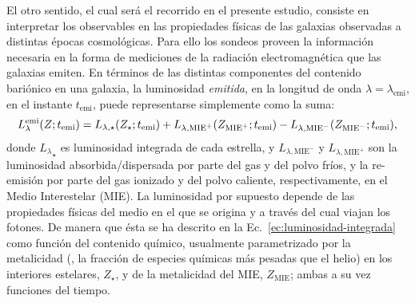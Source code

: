 El otro sentido, el cual será el recorrido en el presente estudio, consiste en interpretar los
observables en las propiedades físicas de las galaxias observadas a distintas épocas cosmológicas.
Para ello los sondeos proveen la información necesaria en la forma de mediciones de la radiación
electromagnética que las galaxias emiten. En términos de las distintas componentes del contenido
bariónico en una galaxia, la luminosidad \emph{emitida}, en la longitud de onda
$\lambda=\lambda_\text{emi}$, en el instante $t_\text{emi}$, puede representarse simplemente como la
suma:
%
\begin{equation}\label{ec:luminosidad-integrada}
{L}_\lambda^\text{emi}(Z;t_\text{emi}) = L_{\lambda,\star}(Z_\star;t_\text{emi}) +
                             L_{\lambda,\text{MIE}^+}(Z_{\text{MIE}^+};t_\text{emi}) -
                             L_{\lambda,\text{MIE}^-}(Z_{\text{MIE}^-};t_\text{emi}),
\end{equation}
%
donde ${L_\lambda}_\star$ es luminosidad integrada de cada estrella, y $L_{\lambda,\text{MIE}^-}$ y
$L_{\lambda,\text{MIE}^+}$ son la luminosidad absorbida/dispersada por parte del gas y del polvo
fríos, y la re-emisión por parte del gas ionizado y del polvo caliente, respectivamente, en el Medio
Interestelar (MIE). La luminosidad por supuesto depende de las propiedades físicas del medio en el
que se origina y a través del cual viajan los fotones. De manera que ésta se ha descrito en la
Ec.~\eqref{ec:luminosidad-integrada} como función del contenido químico, usualmente parametrizado
por la metalicidad (\ie, la fracción de especies químicas más pesadas que el helio) en los
interiores estelares, $Z_\star$, y de la metalicidad del MIE, $Z_\text{MIE}$; ambas a su vez
funciones del tiempo.

